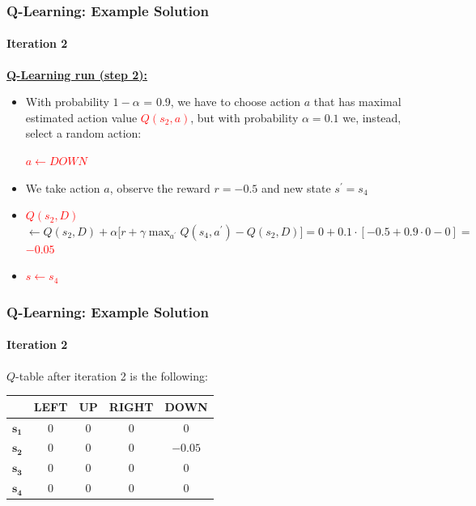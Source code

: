 \begin{frame}[<+->]
	\frametitle{Q-Learning: Example Solution}
	\framesubtitle{Iteration 2}
	
	\vspace{0.5cm}
	
	\textbf{\underline{Q-Learning run (step 2):}}
	
	\begin{itemize}
		\item With probability $ 1 - \alpha $ = 0.9, we have to choose action $ a $ that
			  has maximal estimated action value \textcolor{red}{$ Q(s_2,a) $}, but with
			  probability $ \alpha = 0.1 $ we, instead, select a random action:
			  
			  \begin{center}
				  \textcolor{red}{$ a \leftarrow DOWN $}
			  \end{center}
		\item We take action $ a $, observe the reward $ r = -0.5 $ and new state $
			  s^\prime = s_4 $
		\item \textcolor{red}{$ Q(s_2,D) $} $ \leftarrow Q(s_2,D) + \alpha \Big [ r + \gamma \max_{a^\prime} Q(s_4,a^\prime) - Q(s_2,D) \Big ] = 0 + 0.1 \cdot [ -0.5 + 0.9 \cdot 0 - 0 ] = $ \textcolor{red}{$ -0.05 $}
		\item \textcolor{red}{$ s \leftarrow s_4 $}
	\end{itemize}
\end{frame}

\begin{frame}
	\frametitle{Q-Learning: Example Solution}
	\framesubtitle{Iteration 2}
	
	\Large
	
	$ Q $-table after iteration 2 is the following:
	
	\begin{table}[!h]
		\begin{tabular}{c|c|c|c|c|}
			\cline{2-5}
			& \textbf{LEFT} & \textbf{UP} & \textbf{RIGHT} & \textbf{DOWN} \\ \hline
			\multicolumn{1}{|c|}{$ \mathbf{s_1} $} & $ 0 $ & $ 0 $ & $ 0 $ & $ 0 $\\ \hline
			\multicolumn{1}{|c|}{$ \mathbf{s_2} $} & $ 0 $ & $ 0 $ & $ 0 $ & $ -0.05 $\\ \hline
			\multicolumn{1}{|c|}{$ \mathbf{s_3} $} & $ 0 $ & $ 0 $ & $ 0 $ & $ 0 $\\ \hline
			\multicolumn{1}{|c|}{$ \mathbf{s_4} $} & $ 0 $ & $ 0 $ & $ 0 $ & $ 0 $\\ \hline
		\end{tabular}
	\end{table}
\end{frame}

